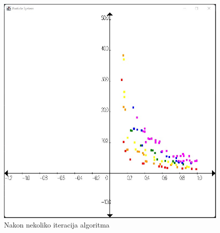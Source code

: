 \documentclass[]{article}
\begin{document}
\begin{figure}[h]
	\includegraphics[scale=0.6]{middle.jpg}
	\centering
	\caption{Nakon nekoliko iteracija algoritma}
	\label{fig:middle}
\end{figure}
\end{document}
